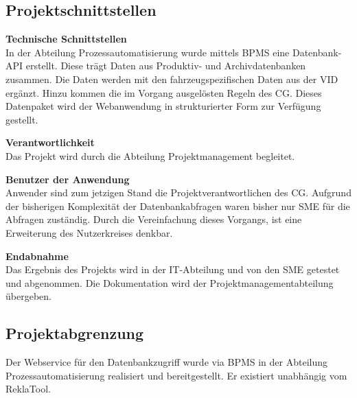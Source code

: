 \subsection{Projektschnittstellen} 
\label{sec:Projektschnittstellen}
\textbf{Technische Schnittstellen}\\
In der Abteilung Prozessautomatisierung wurde mittels \acs{BPMS} eine Datenbank-API erstellt.
Diese trägt Daten aus Produktiv- und Archivdatenbanken zusammen.
Die Daten werden mit den fahrzeugspezifischen Daten aus der \acs{VID} ergänzt.
Hinzu kommen die im Vorgang ausgelösten Regeln des \acs{CG}.
Dieses Datenpaket wird der Webanwendung in strukturierter Form zur Verfügung gestellt.

\textbf{Verantwortlichkeit}\\
Das Projekt wird durch die Abteilung Projektmanagement begleitet.

\textbf{Benutzer der Anwendung}\\
Anwender sind zum jetzigen Stand die Projektverantwortlichen des \acs{CG}.
Aufgrund der bisherigen Komplexität der Datenbankabfragen waren bisher nur \ac{SME}
für die Abfragen zuständig. Durch die Vereinfachung dieses Vorgangs, ist eine Erweiterung des Nutzerkreises denkbar.

\textbf{Endabnahme}\\
Das Ergebnis des Projekts wird in der IT-Abteilung und von den \acs{SME} getestet und abgenommen.
Die Dokumentation wird der Projektmanagementabteilung übergeben.

\subsection{Projektabgrenzung} 
\label{sec:Projektabgrenzung}
Der Webservice für den Datenbankzugriff wurde via \acs{BPMS} in der Abteilung Prozessautomatisierung realisiert und bereitgestellt. 
Er existiert unabhängig vom ReklaTool.

